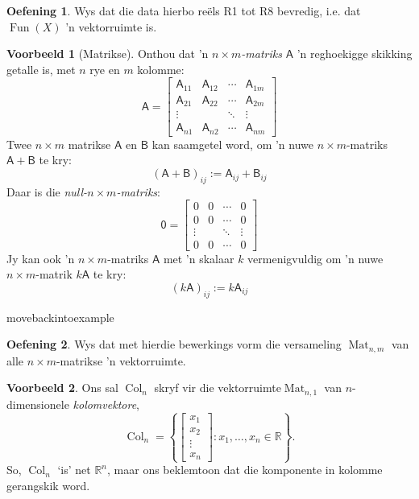 \documentclass[a4paper,11pt]{book}
\theoremstyle{definition}
\newtheorem{exercise}{Oefening}
\newtheorem{example_environment}{Voorbeeld}[chapter]
\newcommand{\mat}[1]{\mathsf{#1}}
\newenvironment{example}
	{
		\begin{oframed}
		\begin{example_environment}
	}
	{
		\end{example_environment}
		\end{oframed}
	}
\DeclareMathOperator{\Fun}{Fun}
\DeclareMathOperator{\Mat}{Mat}
\DeclareMathOperator{\Col}{Col}
\begin{document}
\begin{exercise} Wys dat die data hierbo re{\"e}ls R1 tot R8 bevredig,
	i.e. dat $\Fun(X)$ 'n vektorruimte is.
\end{exercise}
\begin{example}[Matrikse] \label{matrices_example_vec_space} Onthou dat 'n
	\emph{$n \times m$-matriks}
	$\mat{A}$ 'n reghoekigge skikking getalle is, met $n$ rye en $m$
	kolomme:
	\[
		\mat{A} = \left[ \begin{array}{cccc} \mat{A}_{11} & \mat{A}_{12} &
			\cdots & \mat{A}_{1m} \\
			\mat{A}_{21} & \mat{A}_{22} & \cdots & \mat{A}_{2m} \\
			\vdots & & \ddots & \vdots \\
		\mat{A}_{n1} & \mat{A}_{n2} & \cdots & \mat{A}_{nm} \end{array}
		\right]
	\]
	Twee $n \times m$ matrikse $\mat{A}$ en $\mat{B}$ kan saamgetel word,
	om 'n nuwe $n \times m$-matriks $\mat{A} + \mat{B}$ te kry:
	\[
		(\mat{A} + \mat{B})_{ij} := \mat{A}_{ij} + \mat{B}_{ij}
	\]
	Daar is die \emph{null-$n \times m$-matriks}:
	\[
		\mat{0} = \left[ \begin{array}{cccc} 
			0 & 0 &  \cdots &0 \\
			0 & 0 &  \cdots & 0 \\
			\vdots & & \ddots & \vdots \\
			0 & 0 & \cdots & 0
		\end{array} \right] 
	\]
	Jy kan ook 'n $n \times m$-matriks $\mat{A}$ met 'n skalaar $k$
	vermenigvuldig om 'n nuwe $n \times m$-matrik $k \mat{A}$ te kry:
	\[
		(k\mat{A})_{ij} := k \mat{A}_{ij}
	\]
	
\end{example}movebackintoexample
\begin{exercise} Wys dat met hierdie bewerkings vorm die versameling
	$\Mat_{n, m}$ van alle $n \times m$-matrikse 'n
	vektorruimte. 
\end{exercise}
\begin{example} Ons sal $\Col_n$ skryf vir die vektorruimte$\Mat_{n,1}$ van
	$n$-dimensionele \emph{kolomvektore},
	\[
		\Col_n = \left\{ \left[ \begin{array}{c} x_1 \\ x_2 \\ \vdots \\
		x_n \end{array} \right] : x_1, \ldots, x_n \in \mathbb{R} \right\}.
	\]
	So, $\Col_n$ `is' net $\mathbb{R}^n$, maar ons beklemtoon dat die
	komponente in kolomme gerangskik word.
\end{example}
\end{document}
